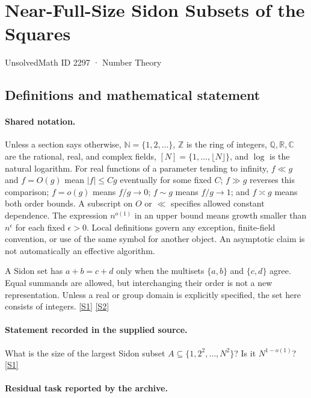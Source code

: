 \documentclass[11pt,a4paper]{article}
\newcommand{\N}{\mathbb{N}}
\newcommand{\Z}{\mathbb{Z}}
\newcommand{\Q}{\mathbb{Q}}
\newcommand{\R}{\mathbb{R}}
\newcommand{\C}{\mathbb{C}}
\newcommand{\sref}[2]{\hyperlink{source:#1:#2}{[S#2]}}
\begin{document}

\setcounter{section}{2296}

\section{Near-Full-Size Sidon Subsets of the Squares}\label{2297}

{\small\sffamily UnsolvedMath ID 2297 · Number Theory}

\subsection{Definitions and mathematical statement}

\paragraph{Shared notation.}Unless a section says otherwise, $\N=\{1,2,\ldots\}$,
$\Z$ is the ring of integers, $\Q,\R,\C$ are the rational, real, and complex
fields, $[N]=\{1,\ldots,\lfloor N\rfloor\}$, and $\log$ is the natural
logarithm. For real functions of a parameter tending to infinity,
$f\ll g$ and $f=O(g)$ mean $|f|\leq Cg$ eventually for some fixed $C$;
$f\gg g$ reverses this comparison; $f=o(g)$ means $f/g\to0$;
$f\sim g$ means $f/g\to1$; and $f\asymp g$ means both order bounds.
A subscript on $O$ or $\ll$ specifies allowed constant dependence.
The expression $n^{o(1)}$ in an upper bound means growth smaller than
$n^\epsilon$ for each fixed $\epsilon>0$. Local definitions govern any
exception, finite-field convention, or use of the same symbol for another
object. An asymptotic claim is not automatically an effective algorithm.



A Sidon set has $a+b=c+d$ only when the multisets $\{a,b\}$ and $\{c,d\}$ agree. Equal summands are allowed, but interchanging their order is not a new representation. Unless a real or group domain is explicitly specified, the set here consists of integers. \sref{2297}{1} \sref{2297}{2}

\paragraph{Statement recorded in the supplied source.}
What is the size of the largest Sidon subset $A\subseteq\{1,2^2,\ldots,N^2\}$? Is it $N^{1-o(1)}$? \sref{2297}{1}

\paragraph{Residual task reported by the archive.}
\end{document}
